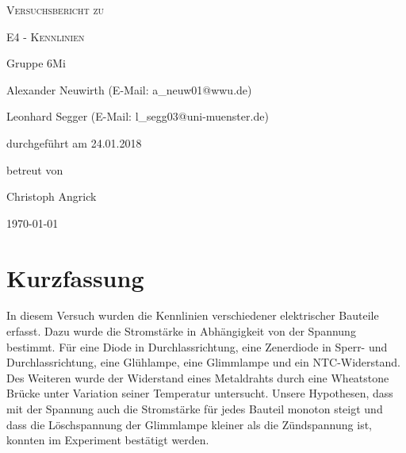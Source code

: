 \documentclass[
	a4paper,
	12pt,
	pagesize,
	ngerman
]{scrartcl}
\begin{document}
	
	\begin{titlepage}
		\centering
		{\scshape\LARGE Versuchsbericht zu \par}
		\vspace{1cm}
		{\scshape\huge E4 - Kennlinien \par} %
		\vspace{2.5cm}
		{\LARGE Gruppe 6Mi \par}
		\vspace{0.5cm}
		
		{\large Alexander Neuwirth (E-Mail: a\_neuw01@wwu.de) \par}
		{\large Leonhard Segger (E-Mail: l\_segg03@uni-muenster.de) \par}
		\vfill
		
		durchgeführt am 24.01.2018\par %
		betreut von\par
		{\large Christoph Angrick} %
		
		\vfill
		
		{\large \today\par}
	\end{titlepage}
	\tableofcontents
	\newpage


	\section{Kurzfassung}
	In diesem Versuch wurden die Kennlinien verschiedener elektrischer Bauteile erfasst.
	Dazu wurde die Stromstärke in Abhängigkeit von der Spannung bestimmt. 
	Für eine Diode in Durchlassrichtung, eine Zenerdiode in Sperr- und Durchlassrichtung, eine Glühlampe, eine Glimmlampe und ein NTC-Widerstand.
	Des Weiteren wurde der Widerstand eines Metaldrahts durch eine Wheatstone Brücke unter Variation seiner Temperatur untersucht.
	Unsere Hypothesen, dass mit der Spannung auch die Stromstärke für jedes Bauteil monoton steigt und dass die Löschspannung der Glimmlampe kleiner als die Zündspannung ist, konnten im Experiment bestätigt werden.

	
\end{document}
